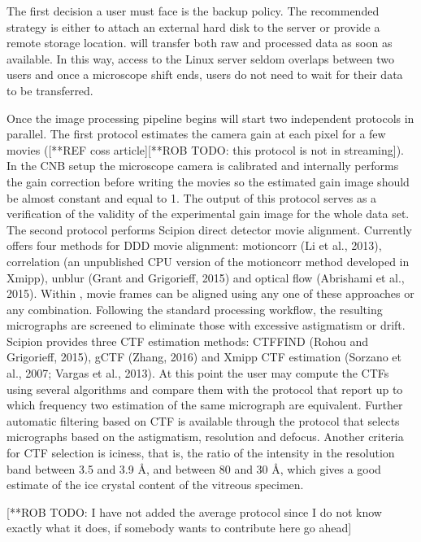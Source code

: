 The first decision a user must face is the backup policy. The recommended strategy is either to attach an external hard disk to the server or provide a remote storage location. \scipionbox will transfer both raw and processed data as soon as available. In this way, access to the Linux server seldom overlaps between two users and once a microscope shift ends, users do not need to wait for their data to be transferred. 

Once the image processing pipeline begins \scipionbox will start two independent protocols in parallel. The first protocol estimates the camera gain at each pixel for a few  movies ([**REF coss article][**ROB TODO: this protocol is not in streaming]). In the CNB setup the microscope camera is calibrated and internally performs the gain correction before writing the movies so the estimated gain image should be almost constant and equal to 1. The output of this protocol serves as a verification of the validity of the experimental gain image for the whole data set. The second protocol performs Scipion direct detector movie alignment. Currently \scipionbox offers  four  methods  for  DDD  movie  alignment: motioncorr (Li et al., 2013),
correlation (an unpublished CPU version of the motioncorr method developed in Xmipp),
unblur (Grant and Grigorieff, 2015) and optical flow (Abrishami et al., 2015). Within \scipionbox, movie frames can be aligned using any one of these approaches or any combination. Following the standard processing workflow, the resulting micrographs are screened to eliminate those with excessive astigmatism or drift. Scipion provides three CTF estimation methods:
CTFFIND (Rohou and Grigorieff, 2015), gCTF (Zhang, 2016) and Xmipp CTF estimation (Sorzano et al., 2007; Vargas et al., 2013). At this point the user may compute the CTFs using several algorithms and compare them with the protocol  that report up to which frequency two estimation of the same micrograph are equivalent. Further automatic filtering based on CTF is available through the protocol  that selects micrographs based on the astigmatism, resolution and defocus. Another criteria for CTF selection is iciness, that is,  the ratio of the intensity in the resolution band between 3.5 and 3.9 \AA, and between 80 and 30 \AA, which gives a good estimate of the ice crystal content of the vitreous specimen.

[**ROB TODO: I have not added the average protocol since I do not know exactly what it does, if somebody wants to contribute here go ahead]

